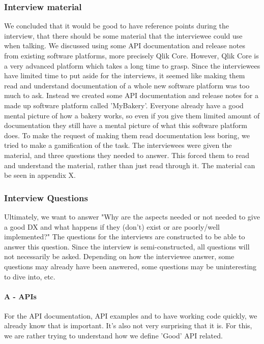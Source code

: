 \documentclass{article}
\begin{document}
\subsubsection{Interview material}
We concluded that it would be good to have reference points during the interview,
that there should be some material that the interviewee could use when talking.
We discussed using some API documentation and release notes from existing software platforms,
more precisely Qlik Core. However, Qlik Core is a very advanced platform which takes a long time
to grasp. Since the interviewees have limited time to put aside for the interviews, it seemed
like making them read and understand documentation of a whole new software platform was too much to ask.
Instead we created some API documentation and release notes for a made up software platform
called 'MyBakery'. Everyone already have a good mental picture of how a bakery works,
so even if you give them limited amount of documentation they still have a mental picture
of what this software platform does. To make the request of making them read documentation less boring,
we tried to make a gamification of the task. The interviewees were given the material, and
three questions they needed to answer. This forced them to read and understand the material, rather
than just read through it. The material can be seen in appendix X.

\subsubsection{Interview Questions}

Ultimately, we want to answer "Why are the aspects needed or not needed
to give a good DX and what happens if they (don’t) exist or are poorly/well implemented?"
The questions for the interviews are constructed to be able to answer this question.
Since the interview is semi-constructed, all questions will not necessarily be asked.
Depending on how the interviewee answer, some questions may already have been answered,
some questions may be uninteresting to dive into, etc.
\paragraph{A - APIs}
For the API documentation, API examples and to have working code quickly, we
already know that is important. It's also not very surprising that it is.
For this, we are rather trying to understand how we define 'Good' API related.
\end{document}
